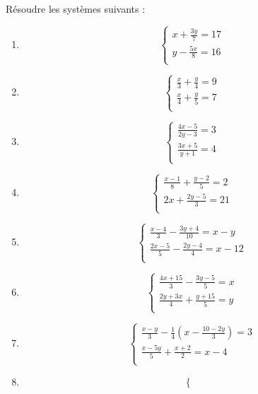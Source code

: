 \begin{exercice} 
Résoudre les systèmes suivants :
\begin{multicols}{2}
\begin{enumerate}
\item $$\left\{ \begin{array} {l}
    x+\frac{3y}{7}=17 \\ 
   y-\frac{5x}{8}=16 \\ 
\end{array} \right.$$ 
\item $$\left\{ \begin{array} {l}
    \frac{x}{3}+\frac{y}{4}=9 \\ 
   \frac{x}{4}+\frac{y}{5}=7 \\ 
\end{array} \right.$$ 
\item $$\left\{ \begin{array} {l}
    \frac{4x-5}{2y-3}=3 \\ 
   \frac{3x+5}{y+1}=4 \\ 
\end{array} \right.$$ 
\item $$\left\{ \begin{array} {l}
    \frac{x-1}{8}+\frac{y-2}{5}=2 \\ 
   2x+\frac{2y-5}{3}=21 \\ 
\end{array} \right.$$ 
\item $$\left\{ \begin{array} {l}
    \frac{x-4}{3}-\frac{3y+4}{10}=x-y \\ 
   \frac{2x-5}{5}-\frac{2y-4}{4}=x-12 \\ 
\end{array} \right.$$ 
\item $$\left\{ \begin{array} {l}
    \frac{4x+15}{3}-\frac{3y-5}{5}=x \\ 
   \frac{2y+3x}{4}+\frac{y+15}{5}=y \\ 
\end{array} \right.$$
\item $$\left\{ \begin{array} {l}
    \frac{x-y}{3}-\frac{1}{4}\left( x-\frac{10-2y}{3} \right)=3 \\ 
   \frac{x-5y}{5}+\frac{x+2}{2}=x-4 \\ 
\end{array} \right.$$
\item $$\left\{ \begin{array} {l}

\end{array}$$
\end{enumerate}
\end{multicols}
\end{exercice}
